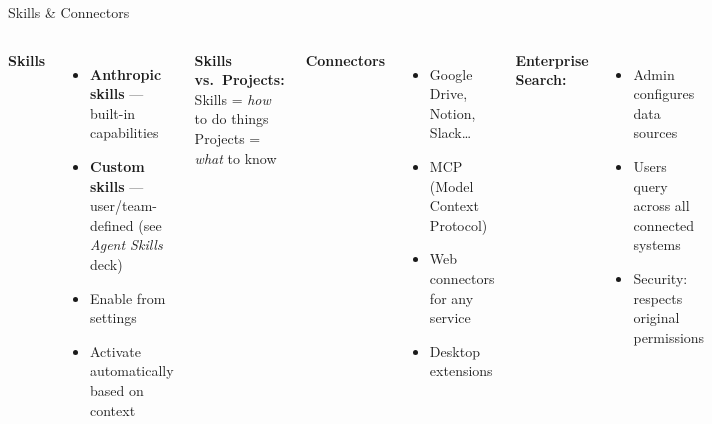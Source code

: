 \documentclass[aspectratio=169]{beamer}
\begin{document}
\begin{frame}{Skills \& Connectors}
\begin{columns}[T]
\textbf{\color{popblue}Skills}
\begin{itemize}
  \item \textbf{Anthropic skills} --- built-in capabilities
  \item \textbf{Custom skills} --- user/team-defined (see \emph{Agent Skills} deck)
  \item Enable from settings
  \item Activate automatically based on context
\end{itemize}

\bigskip
\textbf{Skills vs.\ Projects:}\\
Skills = \emph{how} to do things\\
Projects = \emph{what} to know

\textbf{\color{paramgreen}Connectors}
\begin{itemize}
  \item Google Drive, Notion, Slack\ldots
  \item MCP (Model Context Protocol)
  \item Web connectors for any service
  \item Desktop extensions
\end{itemize}

\bigskip
\textbf{Enterprise Search:}
\begin{itemize}
  \item Admin configures data sources
  \item Users query across all connected systems
  \item Security: respects original permissions
\end{itemize}
\end{columns}
\end{frame}
\end{document}
